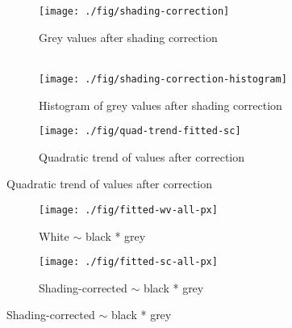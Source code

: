 \documentclass[10pt,fleqn]{article}
\begin{document}
\begin{figure}[!ht] %
\caption{Shading correction: $60000 \times (G-B) / (W - B)$}

\centering

\begin{subfigure}[t]{0.32\textwidth}
\caption{Grey values after shading correction \\\\}
\texttt{[image: ./fig/shading-correction]}
\end{subfigure}
%
\begin{subfigure}[t]{0.32\textwidth}
\caption{Histogram of grey values after shading correction\\}
\texttt{[image: ./fig/shading-correction-histogram]}
\end{subfigure}
%
\begin{subfigure}[t]{0.32\textwidth}
\caption{Quadratic trend of values after correction \\ \tiny{}}
\texttt{[image: ./fig/quad-trend-fitted-sc]}
\end{subfigure}

\end{figure}
\begin{figure}[!ht] %
\caption{Predicting values by linear regression over other images}
\centering

\begin{subfigure}[t]{0.32\textwidth}
\caption{White $\sim$ black * grey \\ \textit{\scriptsize{}}}
\texttt{[image: ./fig/fitted-wv-all-px]}
\end{subfigure}
%
\begin{subfigure}[t]{0.32\textwidth}
\caption{Shading-corrected  $\sim$ black * grey  \\ \textit{\scriptsize{}}}
\texttt{[image: ./fig/fitted-sc-all-px]}
\end{subfigure}

\end{figure}
\end{document}
